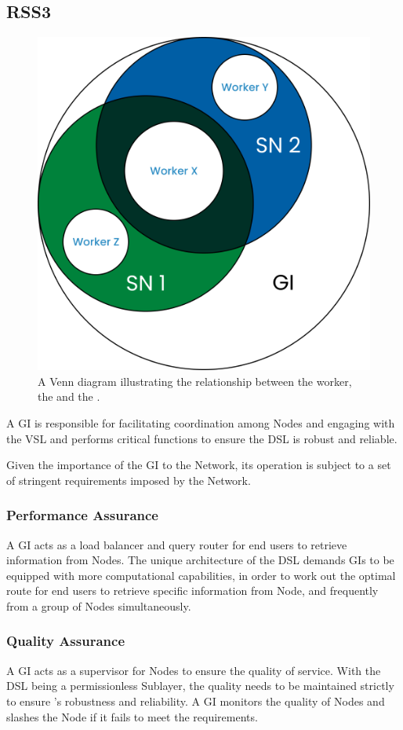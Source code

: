 \subsection{RSS3 }
\label{subsec:GI}

{
    \begin{figure}[tb!]
        \centering
        \includegraphics[width=0.7\columnwidth]{figures/GI.png}
        \caption{A Venn diagram illustrating the relationship between the worker, the  and the .}
        \label{fig:GI}
    \end{figure}
}

A \gls{GI} is responsible for facilitating coordination among \glspl{Node} and engaging with the \gls{VSL} and performs critical functions to ensure the \gls{DSL} is robust and reliable.

Given the importance of the \gls{GI} to the Network, its operation is subject to a set of stringent requirements imposed by the Network.

\subsubsection{Performance Assurance} A GI acts as a load balancer and query router for end users to retrieve information from \glspl{Node}.
The unique architecture of the \gls{DSL} demands \glspl{GI} to be equipped with more computational capabilities, in order to work out the optimal route for end users to retrieve specific information from \gls{Node}, and frequently from a group of \glspl{Node} simultaneously.

\subsubsection{Quality Assurance} A GI acts as a supervisor for \glspl{Node} to ensure the quality of service.
With the \gls{DSL} being a permissionless Sublayer, the quality needs to be maintained strictly to ensure 's robustness and reliability.
A \gls{GI} monitors the quality of \glspl{Node} and slashes the \gls{Node} if it fails to meet the requirements.

